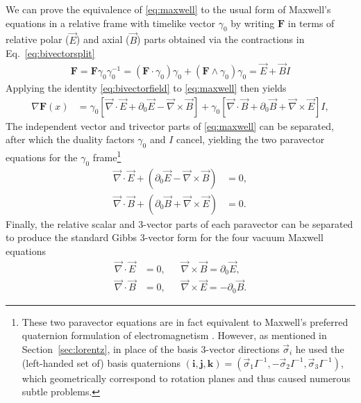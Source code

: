 \documentclass[1p,sort&compress]{elsarticle}
\numberwithin{equation}{section}
\newcommand{\rv}[1]{\vec{#1}}
\newcommand{\bv}[1]{\mathbf{#1}}
\begin{document}

We can prove the equivalence of \eqref{eq:maxwell} to the usual form of Maxwell's equations in a relative frame with timelike vector $\gamma_0$ by writing $\bv{F}$ in terms of relative polar ($\rv{E}$) and axial ($\rv{B}$) parts obtained via the contractions in Eq.~\eqref{eq:bivectorsplit}
\begin{align}\label{eq:maxwellsplit}
  \bv{F} = \bv{F}\gamma_0\gamma_0^{-1} = (\bv{F}\cdot\gamma_0)\gamma_0 + (\bv{F}\wedge\gamma_0)\gamma_0 = \rv{E} + \rv{B}I
\end{align}
Applying the identity \eqref{eq:bivectorfield} to \eqref{eq:maxwell} then yields 
\begin{align}
  \nabla \bv{F}(x) &= \gamma_0\left[\rv{\nabla}\cdot\rv{E} + \partial_0 \rv{E} - \rv{\nabla}\times\rv{B}\right] + \gamma_0\left[\rv{\nabla}\cdot\rv{B} + \partial_0 \rv{B} + \rv{\nabla}\times\rv{E}\right]I, 
\end{align}
The independent vector and trivector parts of \eqref{eq:maxwell} can be separated, after which the duality factors $\gamma_0$ and $I$ cancel, yielding the two paravector equations for the $\gamma_0$ frame\footnote{These two paravector equations are in fact equivalent to Maxwell's preferred quaternion formulation of electromagnetism \cite{Maxwell1881}.  However, as mentioned in Section~\ref{sec:lorentz}, in place of the basis 3-vector directions $\rv{\sigma}_i$ he used the (left-handed set of) basis quaternions $(\bv{i},\bv{j},\bv{k}) = (\rv{\sigma}_1 I^{-1}, -\rv{\sigma}_2 I^{-1},\rv{\sigma}_3 I^{-1})$, which geometrically correspond to rotation planes and thus caused numerous subtle problems.}
\begin{align}
  \rv{\nabla}\cdot\rv{E} + (\partial_0 \rv{E} - \rv{\nabla}\times\rv{B})&= 0, \\
  \rv{\nabla}\cdot\rv{B} + (\partial_0 \rv{B} + \rv{\nabla}\times\rv{E})&= 0. \nonumber
\end{align}
Finally, the relative scalar and 3-vector parts of each paravector can be separated to produce the standard Gibbs 3-vector form for the four vacuum Maxwell equations \cite{Jackson1999,Landau1975}
\begin{align}\label{eq:maxwellfour}
  \rv{\nabla}\cdot\rv{E} &= 0 , ~~~~~~~\rv{\nabla}\times\rv{B} = \partial_0 \rv{E}, \\
  \rv{\nabla}\cdot\rv{B} &= 0 , ~~~~~~~ \rv{\nabla}\times\rv{E} = - \partial_0 \rv{B}. \nonumber
\end{align}
\end{document}

